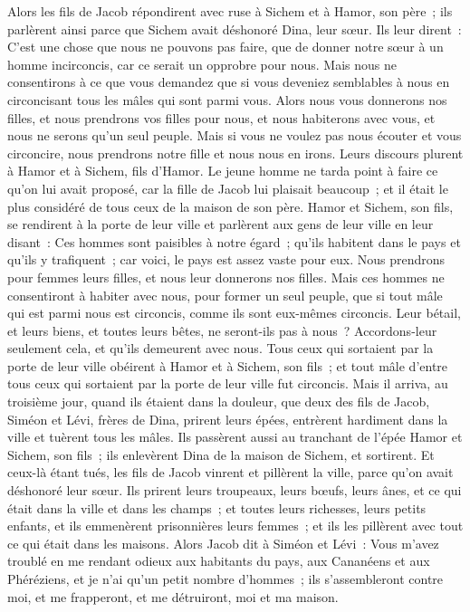 \begin{multicols}{2}
Alors les fils de Jacob répondirent avec ruse à Sichem et à Hamor, son père~; ils parlèrent ainsi parce que Sichem avait déshonoré Dina, leur sœur.
Ils leur dirent~: C'est une chose que nous ne pouvons pas faire, que de donner notre sœur à un homme incirconcis, car ce serait un opprobre pour nous.
Mais nous ne consentirons à ce que vous demandez que si vous deveniez semblables à nous en circoncisant tous les mâles qui sont parmi vous.
Alors nous vous donnerons nos filles, et nous prendrons vos filles pour nous, et nous habiterons avec vous, et nous ne serons qu'un seul peuple.
Mais si vous ne voulez pas nous écouter et vous circoncire, nous prendrons notre fille et nous nous en irons.
Leurs discours plurent à Hamor et à Sichem, fils d'Hamor.
Le jeune homme ne tarda point à faire ce qu'on lui avait proposé, car la fille de Jacob lui plaisait beaucoup~; et il était le plus considéré de tous ceux de la maison de son père.
Hamor et Sichem, son fils, se rendirent à la porte de leur ville et parlèrent aux gens de leur ville en leur disant~:
Ces hommes sont paisibles à notre égard~; qu'ils habitent dans le pays et qu'ils y trafiquent~; car voici, le pays est assez vaste pour eux. Nous prendrons pour femmes leurs filles, et nous leur donnerons nos filles.
Mais ces hommes ne consentiront à habiter avec nous, pour former un seul peuple, que si tout mâle qui est parmi nous est circoncis, comme ils sont eux-mêmes circoncis.
Leur bétail, et leurs biens, et toutes leurs bêtes, ne seront-ils pas à nous~? Accordons-leur seulement cela, et qu'ils demeurent avec nous.
Tous ceux qui sortaient par la porte de leur ville obéirent à Hamor et à Sichem, son fils~; et tout mâle d'entre tous ceux qui sortaient par la porte de leur ville fut circoncis.
Mais il arriva, au troisième jour, quand ils étaient dans la douleur, que deux des fils de Jacob, Siméon et Lévi, frères de Dina, prirent leurs épées, entrèrent hardiment dans la ville et tuèrent tous les mâles.
Ils passèrent aussi au tranchant de l'épée Hamor et Sichem, son fils~; ils enlevèrent Dina de la maison de Sichem, et sortirent.
Et ceux-là étant tués, les fils de Jacob vinrent et pillèrent la ville, parce qu'on avait déshonoré leur sœur.
Ils prirent leurs troupeaux, leurs bœufs, leurs ânes, et ce qui était dans la ville et dans les champs~;
et toutes leurs richesses, leurs petits enfants, et ils emmenèrent prisonnières leurs femmes~; et ils les pillèrent avec tout ce qui était dans les maisons.
Alors Jacob dit à Siméon et Lévi~: Vous m'avez troublé en me rendant odieux aux habitants du pays, aux Cananéens et aux Phéréziens, et je n'ai qu'un petit nombre d'hommes~; ils s'assembleront contre moi, et me frapperont, et me détruiront, moi et ma maison.

\end{multicols}
